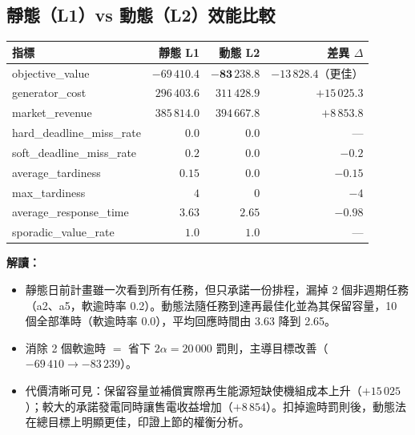 \documentclass[12pt,a4paper,fontset=none]{ctexart}
\begin{document}
\subsection{靜態（L1）vs 動態（L2）效能比較}
\begin{center}
\begin{tabularx}{\linewidth}{Xrrr}
\toprule
\textbf{指標} & \textbf{靜態 L1} & \textbf{動態 L2} & \textbf{差異 $\Delta$} \\
\midrule
objective\_value & $-69\,410.4$ & $\mathbf{-83\,238.8}$ & $-13\,828.4$（更佳） \\
generator\_cost & $296\,403.6$ & $311\,428.9$ & $+15\,025.3$ \\
market\_revenue & $385\,814.0$ & $394\,667.8$ & $+8\,853.8$ \\
hard\_deadline\_miss\_rate & $0.0$ & $0.0$ & --- \\
soft\_deadline\_miss\_rate & $\mathbf{0.2}$ & $\mathbf{0.0}$ & $-0.2$ \\
average\_tardiness & $0.15$ & $0.0$ & $-0.15$ \\
max\_tardiness & $4$ & $0$ & $-4$ \\
average\_response\_time & $3.63$ & $2.65$ & $-0.98$ \\
sporadic\_value\_rate & $1.0$ & $1.0$ & --- \\
\bottomrule
\end{tabularx}
\end{center}
\noindent\textbf{解讀：}
\begin{itemize}
  \item 靜態日前計畫雖一次看到所有任務，但只承諾一份排程，漏掉 2 個非週期任務（a2、a5，軟逾時率 0.2）。動態法隨任務到達再最佳化並為其保留容量，10 個全部準時（軟逾時率 0.0），平均回應時間由 3.63 降到 2.65。
  \item 消除 2 個軟逾時 $=$ 省下 $2\alpha=20\,000$ 罰則，主導目標改善（$-69\,410 \to -83\,239$）。
  \item 代價清晰可見：保留容量並補償實際再生能源短缺使機組成本上升（$+15\,025$）；較大的承諾發電同時讓售電收益增加（$+8\,854$）。扣掉逾時罰則後，動態法在總目標上明顯更佳，印證上節的權衡分析。
\end{itemize}

\end{document}
